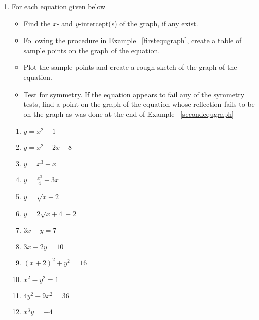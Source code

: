 \begin{enumerate}

\item For each equation given below

\begin{itemize}

\item Find the $x$- and $y$-intercept(s) of the graph, if any exist.

\item Following the procedure in Example \hspace{-.1in} ~\ref{firstequgraph}, create a table of sample points on the graph of the equation.

\item Plot the sample points and create a rough sketch of the graph of the equation.

\item Test for symmetry.  If the equation appears to fail any of the symmetry tests, find a point on the graph of the equation whose reflection fails to be on the graph as was done at the end of Example \hspace{-.1in} ~\ref{secondequgraph}

\end{itemize}

\begin{multicols}{2}

\begin{enumerate}

\item $y = x^{2} + 1$
\item  $y = x^2-2x-8$

\item $y = x^{3} - x$
\item  $y = \frac{x^3}{4} - 3x$


\item $y = \sqrt{x - 2}$
\item  $y = 2 \sqrt{x+4} - 2$

\item $3x - y = 7$
\item  $3x-2y = 10$

\item  $(x+2)^2+y^2 = 16$

\item $x^{2} - y^{2} = 1$
\item  $4y^2 - 9x^2 = 36$


\item $x^{3}y = -4$ 


\end{enumerate}
\end{multicols}
\end{enumerate}
